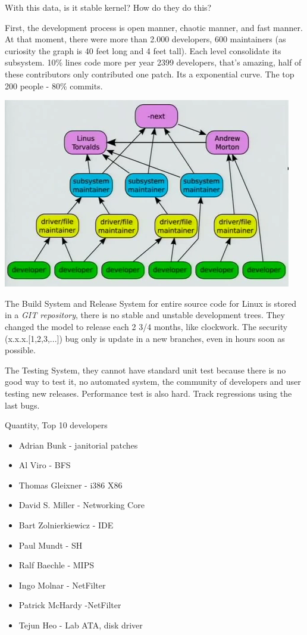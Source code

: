 \documentclass[11pt]{article}
\begin{document}
With this data, is it stable kernel? How do they do this? 

First, the development process is open manner, chaotic manner, and fast manner. At that moment, there were more than 2.000 developers, 600 maintainers (as curiosity the graph is 40 feet long and 4 feet tall). Each level consolidate its subsystem. 10\% lines code more per year
2399 developers, that's amazing, half of these contributors only contributed one patch. Its a exponential curve. The top 200 people - 80\%
commits.

\hfill\includegraphics[scale=0.7]{img/organizationKernel}\hspace*{\fill}

The Build System and Release System for entire source code for Linux is stored in a \emph{GIT repository}, there is no stable and unstable development trees. They changed the model to release each 2 3/4 months, like clockwork. The security (x.x.x.[1,2,3,...]) bug only is update in a new branches, even in hours soon as possible.  

The Testing System,	they cannot have standard unit test because there is no good way to test it, no automated system, the community of developers and user testing new releases. 	Performance test is also hard. Track regressions using the last bugs.

Quantity, Top 10 developers
\begin{itemize}
	\item Adrian Bunk - janitorial patches
	\item Al Viro - BFS
	\item Thomas Gleixner - i386 X86
	\item David S. Miller - Networking Core
	\item Bart Zolnierkiewicz - IDE
	\item Paul Mundt - SH
	\item Ralf Baechle - MIPS
	\item Ingo Molnar - NetFilter
	\item Patrick McHardy -NetFilter
	\item Tejun Heo - Lab ATA, disk driver
\end{itemize}	
\end{document}
